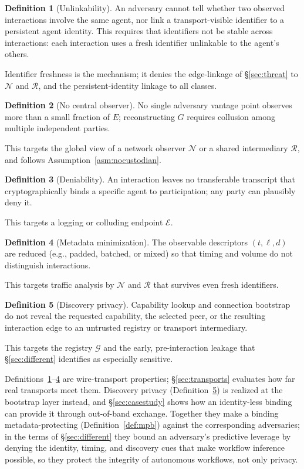\documentclass[10pt,twocolumn]{article}
\theoremstyle{definition}
\newtheorem{definition}{Definition}
\begin{document}
\begin{definition}[Unlinkability]\label{def:unlink}
An adversary cannot tell whether two observed interactions involve the same agent,
nor link a transport-visible identifier to a persistent agent identity. This
requires that identifiers not be stable across interactions: each interaction uses
a fresh identifier unlinkable to the agent's others.
\end{definition}
\noindent Identifier freshness is the mechanism; it denies the edge-linkage of
\S\ref{sec:threat} to $\mathcal{N}$ and $\mathcal{R}$, and the persistent-identity
linkage to all classes.

\begin{definition}[No central observer]\label{def:nocentral}
No single adversary vantage point observes more than a small fraction of $E$;
reconstructing $G$ requires collusion among multiple independent parties.
\end{definition}
\noindent This targets the global view of a network observer $\mathcal{N}$ or a
shared intermediary $\mathcal{R}$, and follows Assumption~\ref{asm:nocustodian}.

\begin{definition}[Deniability]\label{def:deny}
An interaction leaves no transferable transcript that cryptographically binds a
specific agent to participation; any party can plausibly deny it.
\end{definition}
\noindent This targets a logging or colluding endpoint $\mathcal{E}$.

\begin{definition}[Metadata minimization]\label{def:minimize}
The observable descriptors $(t,\ell,d)$ are reduced (e.g., padded, batched, or
mixed) so that timing and volume do not distinguish interactions.
\end{definition}
\noindent This targets traffic analysis by $\mathcal{N}$ and $\mathcal{R}$ that
survives even fresh identifiers.

\begin{definition}[Discovery privacy]\label{def:discovery}
Capability lookup and connection bootstrap do not reveal the requested capability,
the selected peer, or the resulting interaction edge to an untrusted registry or
transport intermediary.
\end{definition}
\noindent This targets the registry $\mathcal{G}$ and the early, pre-interaction
leakage that \S\ref{sec:different} identifies as especially sensitive.

Definitions~\ref{def:unlink}--\ref{def:minimize} are wire-transport properties;
\S\ref{sec:transports} evaluates how far real transports meet them. Discovery
privacy (Definition~\ref{def:discovery}) is realized at the bootstrap layer instead,
and \S\ref{sec:casestudy} shows how an identity-less binding can provide it through
out-of-band exchange. Together they make a binding metadata-protecting
(Definition~\ref{def:mpb}) against the corresponding adversaries; in the terms of
\S\ref{sec:different} they bound an adversary's predictive leverage by denying the
identity, timing, and discovery cues that make workflow inference possible, so they
protect the integrity of autonomous workflows, not only privacy.
\end{document}
